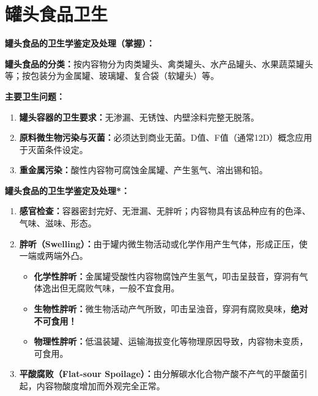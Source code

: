 \section{罐头食品卫生}

\begin{keybox}
\difficulty \textbf{罐头食品的卫生学鉴定及处理（掌握）：}

\textbf{罐头食品的分类：}按内容物分为肉类罐头、禽类罐头、水产品罐头、水果蔬菜罐头等；按包装分为金属罐、玻璃罐、复合袋（软罐头）等。

\textbf{主要卫生问题：}
\begin{enumerate}[leftmargin=*]
    \item \textbf{罐头容器的卫生要求：}无渗漏、无锈蚀、内壁涂料完整无脱落。
    \item \textbf{原料微生物污染与灭菌：}必须达到商业无菌。D值、F值（通常12D）概念应用于灭菌条件设定。
    \item \textbf{重金属污染：}酸性内容物可腐蚀金属罐、产生氢气、溶出锡和铅。
\end{enumerate}

\textbf{罐头食品的卫生学鉴定及处理*：}
\begin{enumerate}[leftmargin=*]
    \item \textbf{感官检查：}容器密封完好、无泄漏、无胖听；内容物具有该品种应有的色泽、气味、滋味、形态。
    \item \textbf{胖听（Swelling）：}由于罐内微生物活动或化学作用产生气体，形成正压，使一端或两端外凸。
    \begin{itemize}
        \item \textbf{化学性胖听：}金属罐受酸性内容物腐蚀产生氢气，叩击呈鼓音，穿洞有气体逸出但无腐败气味，一般不宜食用。
        \item \textbf{生物性胖听：}微生物活动产气所致，叩击呈浊音，穿洞有腐败臭味，\textbf{绝对不可食用！}
        \item \textbf{物理性胖听：}低温装罐、运输海拔变化等物理原因导致，内容物未变质，可食用。
    \end{itemize}
    \item \textbf{平酸腐败（Flat-sour Spoilage）：}由分解碳水化合物产酸不产气的平酸菌引起，内容物酸度增加而外观完全正常。
\end{enumerate}
\end{keybox}

